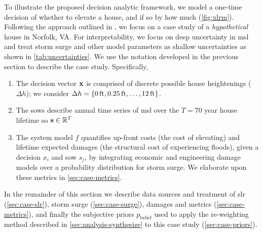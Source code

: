 \documentclass{agujournal2019}
\begin{document}
To illustrate the proposed decision analytic framework, we model a one-time decision of whether to elevate a house, and if so by how much (\cref{fig:xlrm}).
Following the approach outlined in , we focus on a case study of a \emph{hypothetical} house in Norfolk, VA.
For interpretability, we focus on deep uncertainty in \gls{msl} and treat storm surge and other model parameters as shallow uncertainties as shown in \cref{tab:uncertainties}.
We use the notation developed in the previous section to describe the case study.
Specifically,
\begin{enumerate}
  \item The decision vector $\vb{x}$ is comprised of discrete possible house heightenings ($\Delta h$); we consider $\Delta h = \qty{\SI{0}{ft}, \SI{0.25}{ft}, \ldots, \SI{12}{ft}}$.
  \item The \glspl{sow} describe annual time series of \gls{msl} over the $T=70$ year house lifetime so $\vb{s} \in \mathbb{R}^T$
  \item The system model $f$ quantifies up-front costs (the cost of elevating) and lifetime expected damages (the structural cost of experiencing floods), given a decision $x_i$ and \gls{sow} $s_j$, by integrating economic and engineering damage models over a probability distribution for storm surge. We elaborate upon these metrics in \cref{sec:case-metrics}.
\end{enumerate}
In the remainder of this section we describe data sources and treatment of \gls{slr} (\cref{sec:case-slr}), storm surge (\cref{sec:case-surge}), damages and metrics (\cref{sec:case-metrics}), and finally the subjective priors $p_\mathrm{belief}$ used to apply the re-weighting method described in \cref{sec:analysis-synthesize} to this case study (\cref{sec:case-priors}).
\end{document}
